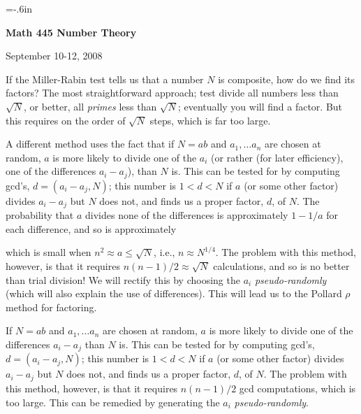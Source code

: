 




\nopagenumbers
\parindent=-20pt
\voffset=-.6in


\def\ctln{\centerline}
\def\u{\underbar}
\def\ssk{\smallskip}
\def\msk{\medskip}
\def\bsk{\bigskip}


\ctln{\bf Math 445 Number Theory}

\medskip

\ctln{September 10-12, 2008}

\bigskip


If the Miller-Rabin test tells us that a number $N$ is composite, how do we find its factors? The most straightforward 
approach; test divide all numbers less than $\sqrt{N}$, or better, all {\it primes} less than $\sqrt{N}$; 
eventually you will find a factor. But this requires on the order of $\sqrt{N}$ steps, which is far too
large. 

\msk

A different method uses the fact that if $N=ab$ and $a_1,\ldots a_n$ are chosen at random, $a$ is more 
likely to divide one of the $a_i$ (or rather (for later efficiency), one of the differences $a_i-a_j$), than $N$
is. This can be tested for by computing gcd's, $d=(a_i-a_j,N)$; this number is $1<d<N$ if $a$ (or some other
factor) divides $a_i-a_j$ but $N$ does not, and finds us a proper factor, $d$, of $N$. The probability that
$a$ divides none of the differences is approximately $1-1/a$ for each difference, and so is approximately

\ssk


\ssk

\noindent which is small when $n^2\approx a\leq\sqrt{N}$, i.e., $n\approx N^{1/4}$. The problem with this method,
however, is that it requires $n(n-1)/2 \approx \sqrt{N}$ calculations, and so is no better than trial division! We 
will rectify this by choosing the $a_i$ {\it pseudo-randomly} (which will also explain the use of differences). This
will lead us to the Pollard $\rho$ method for factoring.

\msk

If $N=ab$ and $a_1,\ldots a_n$ 
are chosen at random, $a$ is more 
likely to divide  one of the differences $a_i-a_j$ than $N$
is. This can be tested for by computing gcd's, $d=(a_i-a_j,N)$; this number 
is $1<d<N$ if $a$ (or some other
factor) divides $a_i-a_j$ but $N$ does not, and finds us a proper factor, 
$d$, of $N$.  The problem with this method,
however, is that it requires $n(n-1)/2$  gcd computations, which is too large. 
This can be remedied by generating the $a_i$ {\it pseudo-randomly}.


